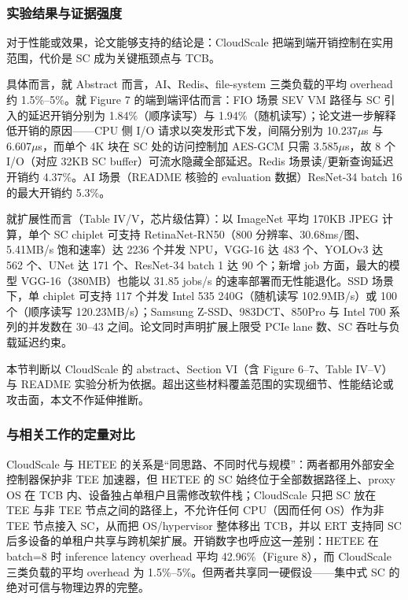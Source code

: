 \documentclass[11pt]{ctexart}
\begin{document}
\subsubsection{实验结果与证据强度}
对于性能或效果，论文能够支持的结论是：CloudScale 把端到端开销控制在实用范围，代价是 SC 成为关键瓶颈点与 TCB。\par
具体而言，就 Abstract 而言，AI、Redis、file-system 三类负载的平均 overhead 约 1.5\%--5\%。就 Figure 7 的端到端评估而言：FIO 场景 SEV VM 路径与 SC 引入的延迟开销分别为 1.84\%（顺序读写）与 1.94\%（随机读写）；论文进一步解释低开销的原因——CPU 侧 I/O 请求以突发形式下发，间隔分别为 10.237$\mu$s 与 6.607$\mu$s，而单个 4K 块在 SC 处的访问控制加 AES-GCM 只需 3.585$\mu$s，故 8 个 I/O（对应 32KB SC buffer）可流水隐藏全部延迟。Redis 场景读/更新查询延迟开销约 4.37\%。AI 场景（README 核验的 evaluation 数据）ResNet-34 batch 16 的最大开销约 5.3\%。\par
就扩展性而言（Table IV/V，芯片级估算）：以 ImageNet 平均 170KB JPEG 计算，单个 SC chiplet 可支持 RetinaNet-RN50（800 分辨率、30.68ms/图、5.41MB/s 饱和速率）达 2236 个并发 NPU，VGG-16 达 483 个、YOLOv3 达 562 个、UNet 达 171 个、ResNet-34 batch 1 达 90 个；新增 job 方面，最大的模型 VGG-16（380MB）也能以 31.85 jobs/s 的速率部署而无性能退化。SSD 场景下，单 chiplet 可支持 117 个并发 Intel 535 240G（随机读写 102.9MB/s）或 100 个（顺序读写 120.23MB/s）；Samsung Z-SSD、983DCT、850Pro 与 Intel 700 系列的并发数在 30--43 之间。论文同时声明扩展上限受 PCIe lane 数、SC 吞吐与负载延迟约束。\par
本节判断以 CloudScale 的 abstract、Section VI（含 Figure 6--7、Table IV--V）与 README 实验分析为依据。超出这些材料覆盖范围的实现细节、性能结论或攻击面，本文不作延伸推断。\par
\subsubsection{与相关工作的定量对比}
CloudScale 与 HETEE 的关系是``同思路、不同时代与规模''：两者都用外部安全控制器保护非 TEE 加速器，但 HETEE 的 SC 始终位于全部数据路径上、proxy OS 在 TCB 内、设备独占单租户且需修改软件栈；CloudScale 只把 SC 放在 TEE 与非 TEE 节点之间的路径上，不允许任何 CPU（因而任何 OS）作为非 TEE 节点接入 SC，从而把 OS/hypervisor 整体移出 TCB，并以 ERT 支持同 SC 后多设备的单租户共享与跨机架扩展。开销数字也呼应这一差别：HETEE 在 batch=8 时 inference latency overhead 平均 42.96\%（Figure 8），而 CloudScale 三类负载的平均 overhead 为 1.5\%--5\%。但两者共享同一硬假设——集中式 SC 的绝对可信与物理边界的完整。\par
\end{document}
